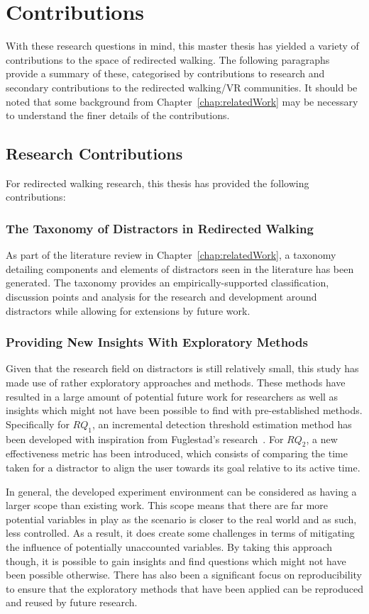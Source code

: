 \section{Contributions}
With these research questions in mind, this master thesis has yielded a variety of contributions to the space of redirected walking. The following paragraphs provide a summary of these, categorised by contributions to research and secondary contributions to the redirected walking/VR communities. It should be noted that some background from Chapter~\ref{chap:relatedWork} may be necessary to understand the finer details of the contributions.

\subsection{Research Contributions}
For redirected walking research, this thesis has provided the following contributions: 

\subsubsection{The Taxonomy of Distractors in Redirected Walking}
As part of the literature review in Chapter~\ref{chap:relatedWork}, a taxonomy detailing components and elements of distractors seen in the literature has been generated. The taxonomy provides an empirically-supported classification, discussion points and analysis for the research and development around distractors while allowing for extensions by future work. 

\subsubsection{Providing New Insights With Exploratory Methods}
Given that the research field on distractors is still relatively small, this study has made use of rather exploratory approaches and methods. These methods have resulted in a large amount of potential future work for researchers as well as insights which might not have been possible to find with pre-established methods. Specifically for $RQ_1$, an incremental detection threshold estimation method has been developed with inspiration from Fuglestad's research~\cite{fuglestad2018redirected}. For $RQ_2$, a new effectiveness metric has been introduced, which consists of comparing the time taken for a distractor to align the user towards its goal relative to its active time. 

In general, the developed experiment environment can be considered as having a larger scope than existing work. This scope means that there are far more potential variables in play as the scenario is closer to the real world and as such, less controlled. As a result, it does create some challenges in terms of mitigating the influence of potentially unaccounted variables. By taking this approach though, it is possible to gain insights and find questions which might not have been possible otherwise. There has also been a significant focus on reproducibility to ensure that the exploratory methods that have been applied can be reproduced and reused by future research. 

